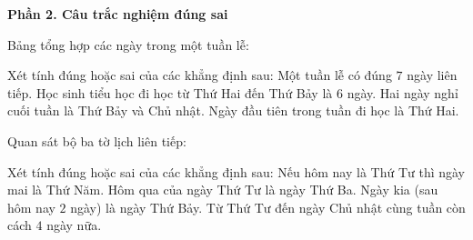 \newpage

\textbf{Phần 2. Câu trắc nghiệm đúng sai}

\begin{ex} %
Bảng tổng hợp các ngày trong một tuần lễ:
\begin{center}\vspace{-2.5mm}
\vspace{-2.5mm}\end{center}
Xét tính đúng hoặc sai của các khẳng định sau:
\choiceTF
{\True Một tuần lễ có đúng $7$ ngày liên tiếp.}
{Học sinh tiểu học đi học từ Thứ Hai đến Thứ Bảy là $6$ ngày.}
{\True Hai ngày nghỉ cuối tuần là Thứ Bảy và Chủ nhật.}
{\True Ngày đầu tiên trong tuần đi học là Thứ Hai.}
\end{ex}

\begin{ex} %
Quan sát bộ ba tờ lịch liên tiếp:
\begin{center}\vspace{-2.5mm}
\vspace{-2.5mm}\end{center}
Xét tính đúng hoặc sai của các khẳng định sau:
\choiceTF
{\True Nếu hôm nay là Thứ Tư thì ngày mai là Thứ Năm.}
{\True Hôm qua của ngày Thứ Tư là ngày Thứ Ba.}
{Ngày kia (sau hôm nay $2$ ngày) là ngày Thứ Bảy.}
{\True Từ Thứ Tư đến ngày Chủ nhật cùng tuần còn cách $4$ ngày nữa.}
\end{ex}

